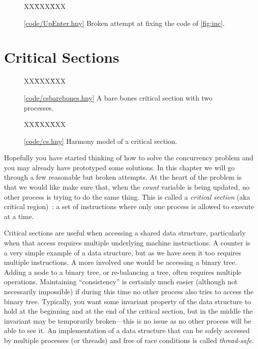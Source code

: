 \documentclass{report}
\newcommand{\harmonysource}[1]{
\begin{tabbing}
XX\=XXX\=XXX\kill
    
\end{tabbing}
}
\newcommand{\harmonylink}[1]{%
[\href{https://www.cs.cornell.edu/home/rvr/harmony/#1}{\underline{#1}}]%
}
\newenvironment{code}{
\tcolorbox
}{
\endtcolorbox
}
\begin{document}
\begin{figure}
\begin{code}
\harmonysource{UpEnter}
\end{code}
\caption{\harmonylink{code/UpEnter.hny} Broken attempt at fixing the code of \autoref{fig:inc}.}
\label{fig:incenter}
\end{figure}

\chapter{Critical Sections}
\label{ch:critical}

\begin{figure}
\begin{code}
\harmonysource{csbarebones}
\end{code}
\caption{\harmonylink{code/csbarebones.hny} A bare bones critical section with two processes.}
\label{fig:csbarebones}
\end{figure}

\begin{figure}
\begin{code}
\harmonysource{cs}
\end{code}
\caption{\harmonylink{code/cs.hny} Harmony model of a critical section.}
\label{fig:cs}
\end{figure}

Hopefully you have started thinking of how to solve the concurrency
problem and you may already have prototyped some solutions.
In this chapter we will go through a few reasonable but broken attempts.
At the heart of the problem is that we would like make sure that, when
the \textit{count} variable is being updated, no other process is
trying to do the same thing.  This is called a \emph{critical section}
(aka critical region)~\cite{EWD123}:
a set of instructions where only one process is allowed to execute at a
time.
%
%

%
%

Critical sections are useful when accessing a shared data
structure, particularly when that access requires multiple underlying
machine instructions.  A counter is a very simple example of
a data structure, but as we have seen it too requires multiple instructions.
A more involved one would be accessing a binary tree.
Adding a node to a binary tree, or re-balancing a tree, often requires
multiple operations.  Maintaining ``consistency'' is certainly much easier
(although not necessarily impossible) if during this time no other
process also tries to access the binary tree.
Typically, you want some invariant property of the data structure to hold
at the beginning and at the end of the critical section, but in the middle
the invariant may be temporarily broken---this is no issue as no other
process will be able to see it.
An implementation of a data structure that can be safely accessed by multiple
processes (or threads) and free of race conditions is called \emph{thread-safe}.
%
%
\end{document}
